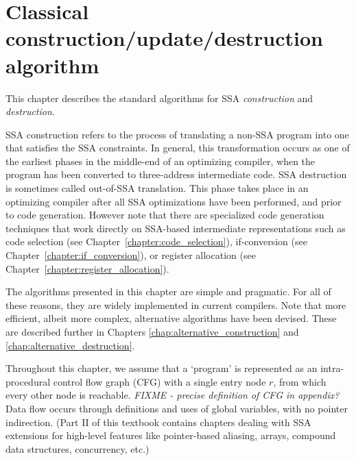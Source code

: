 \chapter{Classical construction/update/destruction algorithm }
\label{chap:classical_construction}


\def\phiops{$\phi$-functions}
\def\phiop{$\phi$-function}


This chapter describes the standard algorithms for SSA \textit{construction} and
\textit{destruction}.

SSA construction refers to the process of translating a non-SSA program into
one that satisfies the SSA constraints. In general, this transformation
occurs as one of the
earliest phases in the middle-end of an optimizing compiler, when the program
has been converted to three-address intermediate code.
SSA destruction is sometimes called out-of-SSA translation. This phase
takes place in an optimizing compiler after all SSA optimizations have
been performed, and prior to code generation. However note that there are
specialized code generation techniques that work directly on SSA-based
intermediate representations such as code selection (see Chapter~\ref{chapter:code_selection}), if-conversion (see Chapter~\ref{chapter:if_conversion}), or register allocation (see Chapter~\ref{chapter:register_allocation}).

The algorithms presented in this chapter are simple and pragmatic.
For all of these reasons, they are widely implemented in current compilers.
Note that more
efficient, albeit more complex, alternative algorithms have been devised.
These are described further in Chapters \ref{chap:alternative_construction}
and \ref{chap:alternative_destruction}.

Throughout this chapter,
we assume that a `program' is represented as an
intra-procedural control flow graph (CFG)
with a single entry node $r$, from which every other
node is reachable.
\emph{FIXME - precise definition of CFG in appendix?}
Data flow occurs through definitions and uses of 
global variables, with no pointer indirection.
(Part II of this textbook contains chapters dealing with
SSA extensions for high-level features like
pointer-based aliasing, arrays, compound data structures, concurrency, etc.)



